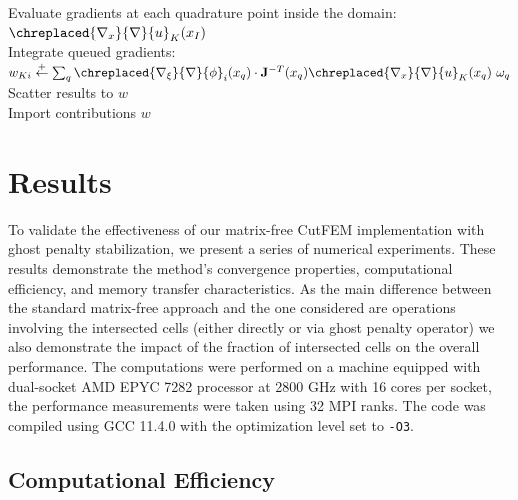 \documentclass[11pt,a4paper]{article}
\begin{document}
\begin{algorithm}[!ht]
{{            Evaluate gradients at each quadrature point inside the domain: \\ \Indp $\chreplaced{\nabla_x}{\nabla} {u}_{K}(x_I) $\\
            \Indm {} Integrate queued gradients: \\ \Indp $w_{Ki} \stackrel{+}{\leftarrow} \sum_q \chreplaced{\nabla_\xi}{\nabla}
                {\phi}_i(x_q) \cdot \bfm{J}^{-T}(x_q) \chreplaced{\nabla_x}{\nabla} {u}_K(x_q) \, \, \omega_q$ \\ \Indm Scatter results
            to ${w}$\\ } }  Import contributions $w$  \caption{Matrix-free application of
        the CutFEM operator} \label{alg:mf_generic}
\end{algorithm}

\section{Results}
\label{sec:numerical_results}
To validate the effectiveness of our matrix-free CutFEM implementation with ghost penalty stabilization, we present a
series of numerical experiments. These results demonstrate the method's convergence properties, computational
efficiency, and memory transfer characteristics. As the main difference between the standard matrix-free approach
and the one considered are operations involving the intersected cells (either directly or via ghost penalty operator)
we also demonstrate the impact of the fraction of intersected cells on the overall performance.
The computations were performed on a machine equipped with dual-socket AMD EPYC 7282 processor at 2800 GHz with 16
cores
per socket, the performance measurements were taken using 32 MPI ranks.
The code was compiled using GCC 11.4.0 with the optimization level set to \texttt{-O3}.

\subsection{Computational Efficiency}
\end{document}
